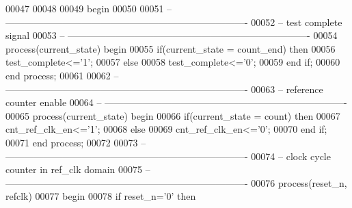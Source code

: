 \begin{DoxyCode}
00047 
00048   
00049 \textcolor{vhdlkeyword}{begin}
00050 
00051 \textcolor{keyword}{-- ----------------------------------------------------------------------------}
00052 \textcolor{keyword}{-- test complete signal}
00053 \textcolor{keyword}{-- ----------------------------------------------------------------------------}
00054 \textcolor{keywordflow}{process}(current_state) \textcolor{keywordflow}{begin}
00055     \textcolor{keywordflow}{if}\textcolor{vhdlchar}{(}\textcolor{vhdlchar}{current_state} \textcolor{vhdlchar}{=} \textcolor{vhdlchar}{count\_end}\textcolor{vhdlchar}{)} \textcolor{keywordflow}{then}
00056         \textcolor{vhdlchar}{test_complete}\textcolor{vhdlchar}{<=}\textcolor{vhdlchar}{'}\textcolor{vhdllogic}{}\textcolor{vhdllogic}{1}\textcolor{vhdlchar}{'};
00057     \textcolor{keywordflow}{else}
00058         \textcolor{vhdlchar}{test_complete}\textcolor{vhdlchar}{<=}\textcolor{vhdlchar}{'}\textcolor{vhdllogic}{}\textcolor{vhdllogic}{0}\textcolor{vhdlchar}{'};
00059     \textcolor{keywordflow}{end} \textcolor{keywordflow}{if};
00060 \textcolor{keywordflow}{end} \textcolor{keywordflow}{process};
00061 
00062 \textcolor{keyword}{-- ----------------------------------------------------------------------------}
00063 \textcolor{keyword}{-- reference counter enable}
00064 \textcolor{keyword}{-- ----------------------------------------------------------------------------}
00065 \textcolor{keywordflow}{process}(current_state) \textcolor{keywordflow}{begin}
00066     \textcolor{keywordflow}{if}\textcolor{vhdlchar}{(}\textcolor{vhdlchar}{current_state} \textcolor{vhdlchar}{=} \textcolor{vhdlchar}{count}\textcolor{vhdlchar}{)} \textcolor{keywordflow}{then}
00067         \textcolor{vhdlchar}{cnt_ref_clk_en}\textcolor{vhdlchar}{<=}\textcolor{vhdlchar}{'}\textcolor{vhdllogic}{}\textcolor{vhdllogic}{1}\textcolor{vhdlchar}{'};
00068     \textcolor{keywordflow}{else}
00069         \textcolor{vhdlchar}{cnt_ref_clk_en}\textcolor{vhdlchar}{<=}\textcolor{vhdlchar}{'}\textcolor{vhdllogic}{}\textcolor{vhdllogic}{0}\textcolor{vhdlchar}{'};
00070     \textcolor{keywordflow}{end} \textcolor{keywordflow}{if};
00071 \textcolor{keywordflow}{end} \textcolor{keywordflow}{process};
00072 
00073 \textcolor{keyword}{-- ----------------------------------------------------------------------------}
00074 \textcolor{keyword}{-- clock cycle counter in ref\_clk domain}
00075 \textcolor{keyword}{-- ----------------------------------------------------------------------------}
00076   \textcolor{keywordflow}{process}(reset_n, refclk)
00077 \textcolor{vhdlkeyword}{    begin}
00078       \textcolor{keywordflow}{if} \textcolor{vhdlchar}{reset_n}\textcolor{vhdlchar}{=}\textcolor{vhdlchar}{'}\textcolor{vhdllogic}{}\textcolor{vhdllogic}{0}\textcolor{vhdlchar}{'} \textcolor{keywordflow}{then}

\end{DoxyCode}
